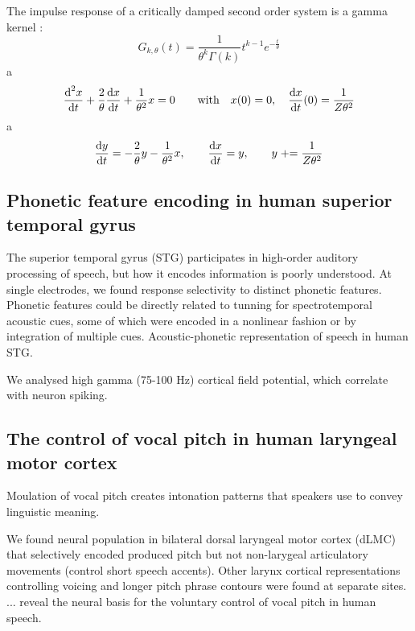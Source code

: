 \documentclass[12pt]{article}
\begin{document}
The impulse response of a critically damped second order system is a gamma kernel : \begin{equation}
G_{k,\theta}(t) = \frac{1}{\theta^k \Gamma(k)} t^{k-1} e^{-\frac{t}{\theta}}
\end{equation}
a
\begin{equation}
\frac{\textnormal{d}^2 x}{\textnormal{d} t} + \frac{2}{\theta} \frac{\textnormal{d} x}{\textnormal{d} t} + \frac{1}{\theta^2} x = 0 \qquad \textnormal{with} \quad x(0) = 0, \quad \frac{\textnormal{d} x}{\textnormal{d} t}(0) = \frac{1}{Z \theta^2}
\end{equation}
a
\begin{equation}
\frac{\textnormal{d} y}{\textnormal{d} t} = -\frac{2}{\theta} y - \frac{1}{\theta^2} x, \qquad
\frac{\textnormal{d} x}{\textnormal{d} t} = y, \qquad
y \mathrel{+}= \frac{1}{Z \theta^2}
\end{equation}



\subsection{Phonetic feature encoding in human superior temporal gyrus \cite{mesgarani2014phonetic}}

The superior temporal gyrus (STG) participates in high-order auditory processing of speech, but how it encodes information is poorly understood. At single electrodes, we found response selectivity to distinct phonetic features. Phonetic features could be directly related to tunning for spectrotemporal acoustic cues, some of which were encoded in a nonlinear fashion or by integration of multiple cues. Acoustic-phonetic representation of speech in human STG.

We analysed high gamma (75-100 Hz) cortical field potential, which correlate with neuron spiking.

\subsection{The control of vocal pitch in human laryngeal motor cortex \cite{dichter2018control}}

Moulation of vocal pitch creates intonation patterns that speakers use to convey linguistic meaning.

We found neural population in bilateral dorsal laryngeal motor cortex (dLMC) that selectively encoded produced pitch but not non-larygeal articulatory movements (control short speech accents). Other larynx cortical representations controlling voicing and longer pitch phrase contours were found at separate sites. ... reveal the neural basis for the voluntary control of vocal pitch in human speech.
\end{document}
